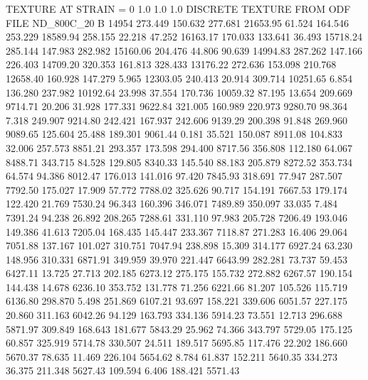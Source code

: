 TEXTURE AT STRAIN = 0
1.0   1.0   1.0
DISCRETE TEXTURE FROM ODF FILE ND_800C_20
B 14954
 273.449  150.632  277.681     21653.95
  61.524  164.546  253.229     18589.94
 258.155   22.218   47.252     16163.17
 170.033  133.641   36.493     15718.24
 285.144  147.983  282.982     15160.06
 204.476   44.806   90.639     14994.83
 287.262  147.166  226.403     14709.20
 320.353  161.813  328.433     13176.22
 272.636  153.098  210.768     12658.40
 160.928  147.279    5.965     12303.05
 240.413   20.914  309.714     10251.65
   6.854  136.280  237.982     10192.64
  23.998   37.554  170.736     10059.32
  87.195   13.654  209.669      9714.71
  20.206   31.928  177.331      9622.84
 321.005  160.989  220.973      9280.70
  98.364    7.318  249.907      9214.80
 242.421  167.937  242.606      9139.29
 200.398   91.848  269.960      9089.65
 125.604   25.488  189.301      9061.44
   0.181   35.521  150.087      8911.08
 104.833   32.006  257.573      8851.21
 293.357  173.598  294.400      8717.56
 356.808  112.180   64.067      8488.71
 343.715   84.528  129.805      8340.33
 145.540   88.183  205.879      8272.52
 353.734   64.574   94.386      8012.47
 176.013  141.016   97.420      7845.93
 318.691   77.947  287.507      7792.50
 175.027   17.909   57.772      7788.02
 325.626   90.717  154.191      7667.53
 179.174  122.420   21.769      7530.24
  96.343  160.396  346.071      7489.89
 350.097   33.035    7.484      7391.24
  94.238   26.892  208.265      7288.61
 331.110   97.983  205.728      7206.49
 193.046  149.386   41.613      7205.04
 168.435  145.447  233.367      7118.87
 271.283   16.406   29.064      7051.88
 137.167  101.027  310.751      7047.94
 238.898   15.309  314.177      6927.24
  63.230  148.956  310.331      6871.91
 349.959   39.970  221.447      6643.99
 282.281   73.737   59.453      6427.11
  13.725   27.713  202.185      6273.12
 275.175  155.732  272.882      6267.57
 190.154  144.438   14.678      6236.10
 353.752  131.778   71.256      6221.66
  81.207  105.526  115.719      6136.80
 298.870    5.498  251.869      6107.21
  93.697  158.221  339.606      6051.57
 227.175   20.860  311.163      6042.26
  94.129  163.793  334.136      5914.23
  73.551   12.713  296.688      5871.97
 309.849  168.643  181.677      5843.29
  25.962   74.366  343.797      5729.05
 175.125   60.857  325.919      5714.78
 330.507   24.511  189.517      5695.85
 117.476   22.202  186.660      5670.37
  78.635   11.469  226.104      5654.62
   8.784   61.837  152.211      5640.35
 334.273   36.375  211.348      5627.43
 109.594    6.406  188.421      5571.43
